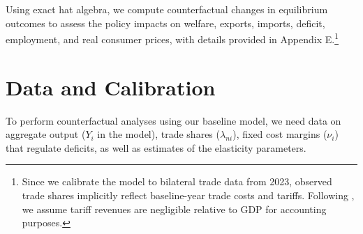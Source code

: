 \documentclass[12pt]{article}
\begin{document}

Using exact hat algebra, we compute counterfactual changes in equilibrium outcomes to assess the policy impacts on welfare, exports, imports, deficit, employment, and real consumer prices, with details provided in Appendix E.\footnote{Since we calibrate the model to bilateral trade data from 2023, observed trade shares implicitly reflect baseline-year trade costs and tariffs. Following  \cite{costinot2014trade}, we assume tariff revenues are negligible relative to GDP for accounting purposes.} 
 
\section{Data and Calibration}

To perform counterfactual analyses using our baseline model, we need data on aggregate output ($Y_i$ in the model), trade shares ($\lambda_{ni}$), fixed cost margins ($\nu_i$) that regulate deficits,  as well as estimates of the elasticity parameters. 
\end{document}
